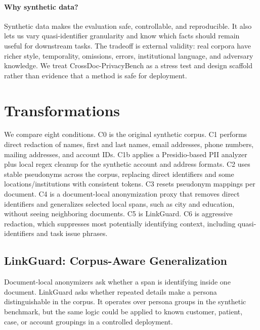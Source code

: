\documentclass{article}
\newcommand{\method}{LinkGuard}
\newcommand{\bench}{CrossDoc-PrivacyBench}
\begin{document}
\paragraph{Why synthetic data?}
Synthetic data makes the evaluation safe, controllable, and reproducible.
It also lets us vary quasi-identifier granularity and know which facts should remain useful for downstream tasks.
The tradeoff is external validity: real corpora have richer style, temporality, omissions, errors, institutional language, and adversary knowledge.
We treat \bench{} as a stress test and design scaffold rather than evidence that a method is safe for deployment.

\section{Transformations}

We compare eight conditions.
C0 is the original synthetic corpus.
C1 performs direct redaction of names, first and last names, email addresses, phone numbers, mailing addresses, and account IDs.
C1b applies a Presidio-based PII analyzer plus local regex cleanup for the synthetic account and address formats.
C2 uses stable pseudonyms across the corpus, replacing direct identifiers and some locations/institutions with consistent tokens.
C3 resets pseudonym mappings per document.
C4 is a document-local anonymization proxy that removes direct identifiers and generalizes selected local spans, such as city and education, without seeing neighboring documents.
C5 is \method.
C6 is aggressive redaction, which suppresses most potentially identifying context, including quasi-identifiers and task issue phrases.

\subsection{\method: Corpus-Aware Generalization}

Document-local anonymizers ask whether a span is identifying inside one document.
\method{} asks whether repeated details make a persona distinguishable in the corpus.
It operates over persona groups in the synthetic benchmark, but the same logic could be applied to known customer, patient, case, or account groupings in a controlled deployment.
\end{document}
